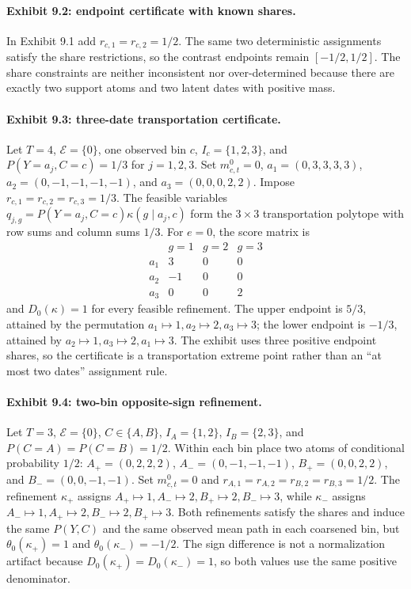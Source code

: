 \documentclass[11pt]{article}
\theoremstyle{definition}
\theoremstyle{plain}
\theoremstyle{remark}
\begin{document}
\paragraph{Exhibit 9.2: endpoint certificate with known shares.}
In Exhibit 9.1 add \(r_{c,1}=r_{c,2}=1/2\). The same two deterministic assignments satisfy the share restrictions, so the contrast endpoints remain \([-1/2,1/2]\). The share constraints are neither inconsistent nor over-determined because there are exactly two support atoms and two latent dates with positive mass.

\paragraph{Exhibit 9.3: three-date transportation certificate.}
Let \(T=4\), \(\mathcal E=\{0\}\), one observed bin \(c\), \(I_c=\{1,2,3\}\), and \(P(Y=a_j,C=c)=1/3\) for \(j=1,2,3\). Set \(m^0_{c,t}=0\), \(a_1=(0,3,3,3,3)\), \(a_2=(0,-1,-1,-1,-1)\), and \(a_3=(0,0,0,2,2)\). Impose \(r_{c,1}=r_{c,2}=r_{c,3}=1/3\). The feasible variables \(q_{j,g}=P(Y=a_j,C=c)\kappa(g\mid a_j,c)\) form the \(3\times3\) transportation polytope with row sums and column sums \(1/3\). For \(e=0\), the score matrix is
\[
\begin{array}{c|ccc}
&g=1&g=2&g=3\\ \hline
a_1&3&0&0\\
a_2&-1&0&0\\
a_3&0&0&2
\end{array}
\]
and \(D_0(\kappa)=1\) for every feasible refinement. The upper endpoint is \(5/3\), attained by the permutation \(a_1\mapsto1,a_2\mapsto2,a_3\mapsto3\); the lower endpoint is \(-1/3\), attained by \(a_2\mapsto1,a_3\mapsto2,a_1\mapsto3\). The exhibit uses three positive endpoint shares, so the certificate is a transportation extreme point rather than an ``at most two dates'' assignment rule.

\paragraph{Exhibit 9.4: two-bin opposite-sign refinement.}
Let \(T=3\), \(\mathcal E=\{0\}\), \(C\in\{A,B\}\), \(I_A=\{1,2\}\), \(I_B=\{2,3\}\), and \(P(C=A)=P(C=B)=1/2\). Within each bin place two atoms of conditional probability \(1/2\): \(A_+=(0,2,2,2)\), \(A_-=(0,-1,-1,-1)\), \(B_+=(0,0,2,2)\), and \(B_-=(0,0,-1,-1)\). Set \(m^0_{c,t}=0\) and \(r_{A,1}=r_{A,2}=r_{B,2}=r_{B,3}=1/2\). The refinement \(\kappa_+\) assigns \(A_+\mapsto1,A_-\mapsto2,B_+\mapsto2,B_-\mapsto3\), while \(\kappa_-\) assigns \(A_-\mapsto1,A_+\mapsto2,B_-\mapsto2,B_+\mapsto3\). Both refinements satisfy the shares and induce the same \(P(Y,C)\) and the same observed mean path in each coarsened bin, but \(\theta_0(\kappa_+)=1\) and \(\theta_0(\kappa_-)=-1/2\). The sign difference is not a normalization artifact because \(D_0(\kappa_+)=D_0(\kappa_-)=1\), so both values use the same positive denominator.
\end{document}
